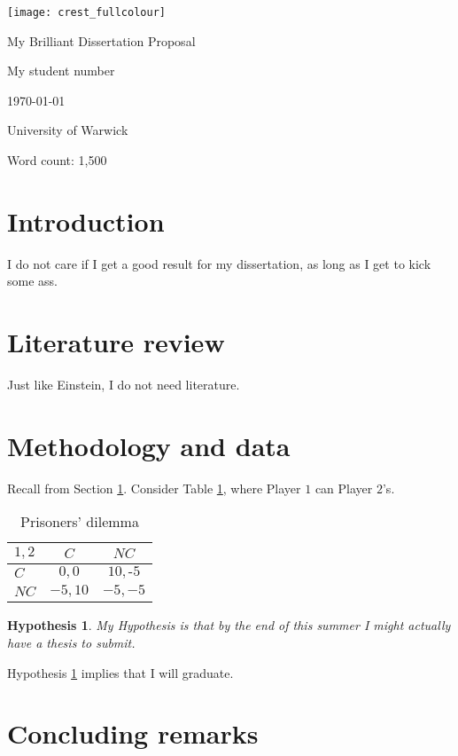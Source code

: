 \documentclass[12pt]{article}
\newtheorem{hypothesis}{Hypothesis}
\begin{document}
\begin{center}
\texttt{[image: crest\_fullcolour]}	

\vspace{2cm}

{\Huge My Brilliant Dissertation Proposal}

\vspace{1cm}

{\large My student number}

\vspace{1cm}

{\large \today}

\vspace{2cm}

{\Large University of Warwick}

\end{center}

\thispagestyle{empty}



\vfill

\begin{flushright}
	Word count: 1,500
\end{flushright}

\newpage

\section{Introduction} \label{Introduction}
I do not care if I get a good result for my dissertation, as long as I get to kick some ass.


\section{Literature review}
Just like Einstein, I do not need literature.

\section{Methodology and data}
Recall from Section \ref{Introduction}. Consider Table \ref{Prisoners' dilemma}, where Player $ 1 $ can Player $ 2 $'s.

\begin{table}[htbp]
\caption{Prisoners' dilemma}
\label{Prisoners' dilemma}
\centering	
\begin{tabular}{|l|c|c|}
	\hline $ 1,2 $ & $ C $ & $ NC $ \\ 
	\hline $ C $ & $ 0,0 $ & $ 10,\text{-}5 $ \\ 
	\hline $ NC $ & $ -5,10 $ & $ -5,-5 $ \\ 
	\hline 
\end{tabular} 
\end{table}

\begin{hypothesis} \label{thesis hypothesis}
	My Hypothesis is that by the end of this summer I might actually have a thesis to submit.
\end{hypothesis}

Hypothesis \ref{thesis hypothesis} implies that I will graduate.

\section{Concluding remarks}
\end{document}

